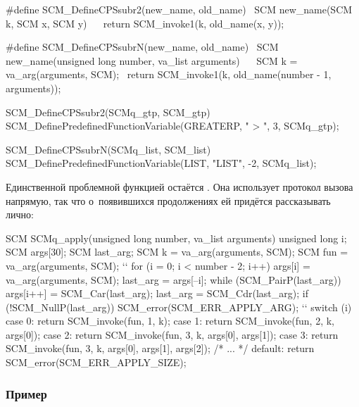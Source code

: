 \begin{code:c}
#define SCM_DefineCPSsubr2(new_name, old_name) \
  SCM new_name(SCM k, SCM x, SCM y)            \
  {                                            \
      return SCM_invoke1(k, old_name(x, y));   \
  }

#define SCM_DefineCPSsubrN(new_name, old_name)                \
  SCM new_name(unsigned long number, va_list arguments)       \
  {                                                           \
      SCM k = va_arg(arguments, SCM);                         \
      return SCM_invoke1(k, old_name(number - 1, arguments)); \
  }

SCM_DefineCPSsubr2(SCMq_gtp, SCM_gtp)
SCM_DefinePredefinedFunctionVariable(GREATERP, " > ", 3, SCMq_gtp);

SCM_DefineCPSsubrN(SCMq_list, SCM_list)
SCM_DefinePredefinedFunctionVariable(LIST, "LIST", -2, SCMq_list);
\end{code:c}

Единственной проблемной функцией остаётся . Она использует протокол
вызова напрямую, так что о~появившихся продолжениях ей придётся рассказывать
лично:

\begin{code:c}
SCM SCMq_apply(unsigned long number, va_list arguments)
{
    unsigned long i;
    SCM args[30];
    SCM last_arg;
    SCM k   = va_arg(arguments, SCM);
    SCM fun = va_arg(arguments, SCM);
``
    for (i = 0; i < number - 2; i++) {
        args[i] = va_arg(arguments, SCM);
    }
    last_arg = args[--i];
    while (SCM_PairP(last_arg)) {
        args[i++] = SCM_Car(last_arg);
        last_arg = SCM_Cdr(last_arg);
    }
    if (!SCM_NullP(last_arg)) {
        SCM_error(SCM_ERR_APPLY_ARG);
    }
``
    switch (i) {
      case 0: return SCM_invoke(fun, 1, k);
      case 1: return SCM_invoke(fun, 2, k, args[0]);
      case 2: return SCM_invoke(fun, 3, k, args[0], args[1]);
      case 3: return SCM_invoke(fun, 3, k, args[0], args[1], args[2]);
      /* ... */
      default: return SCM_error(SCM_ERR_APPLY_SIZE);
    }
}
\end{code:c}


\subsubsection{Пример}\label{cc/call/cc/cc/ssect:example}

